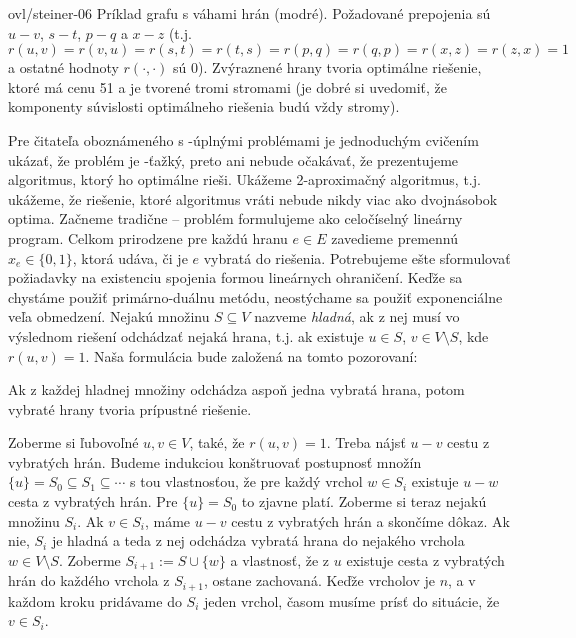 \begin{myfig}{\textwidth}{ovl/steiner-06}
  Príklad grafu s váhami hrán (modré). Požadované prepojenia sú $u-v$, $s-t$, $p-q$ a $x-z$ (t.j.
  $r(u,v)=r(v,u)=r(s,t)=r(t,s)=r(p,q)=r(q,p)=r(x,z)=r(z,x)=1$ a ostatné hodnoty $r(\cdot,\cdot)$ sú 0).
  Zvýraznené hrany tvoria optimálne riešenie, ktoré má cenu 51 a je tvorené tromi stromami 
  (je dobré si uvedomiť, že komponenty súvislosti
  optimálneho riešenia budú vždy stromy).
\end{myfig}

\noindent
Pre čitateľa oboznámeného s \NP-úplnými problémami je jednoduchým cvičením ukázať, že problém
\minsforest je \NP-ťažký, preto ani nebude očakávať, že prezentujeme algoritmus, ktorý ho optimálne rieši.
Ukážeme 2-aproximačný algoritmus, t.j. ukážeme, že riešenie, ktoré algoritmus vráti nebude nikdy viac 
ako dvojnásobok optima. Začneme tradične -- problém formulujeme ako celočíselný lineárny program. Celkom
prirodzene pre každú hranu $e\in E$ zavedieme premennú $x_e\in\{0,1\}$, ktorá udáva, či je $e$ 
vybratá do riešenia. Potrebujeme ešte sformulovať požiadavky na existenciu spojenia formou lineárnych
ohraničení. Keďže sa chystáme použiť primárno-duálnu metódu, neostýchame sa použiť exponenciálne veľa
obmedzení. Nejakú množinu $S\subseteq V$ nazveme {\em hladná}, ak 
z nej musí vo výslednom riešení odchádzať nejaká hrana, t.j. ak existuje $u\in S$, $v\in V\setminus S$,
kde $r(u,v)=1$. 
Naša formulácia bude založená na tomto pozorovaní:

\begin{lema}
  Ak z každej hladnej množiny odchádza aspoň jedna vybratá hrana, potom vybraté hrany tvoria 
  prípustné riešenie.
\end{lema}

\begin{dokaz}
  Zoberme si ľubovoľné $u,v\in V$, také, že $r(u,v)=1$. Treba nájsť $u-v$ cestu z vybratých hrán.
  Budeme indukciou konštruovať postupnosť množín $\{u\}=S_0\subseteq S_1\subseteq\cdots$ s tou vlastnosťou, že
  pre každý vrchol $w\in S_i$ existuje $u-w$ cesta z vybratých hrán. 
  Pre $\{u\}=S_0$ to zjavne platí. Zoberme si teraz nejakú množinu $S_i$. Ak $v\in S_i$, máme $u-v$ cestu
  z vybratých hrán a skončíme dôkaz. Ak nie, $S_i$ je hladná a teda z nej odchádza vybratá hrana do nejakého vrchola 
  $w\in V\setminus S$. Zoberme $S_{i+1}:=S\cup\{w\}$ a vlastnosť, že z $u$ existuje cesta z vybratých hrán do každého
  vrchola z $S_{i+1}$, ostane zachovaná. Keďže vrcholov je $n$, 
  a v každom kroku pridávame do $S_i$ jeden vrchol, časom musíme prísť do situácie, že $v\in S_i$.
\end{dokaz}

